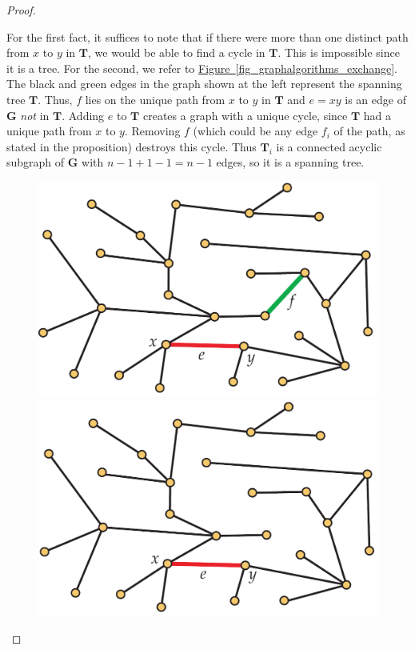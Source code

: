 \documentclass[10pt,]{book}
\theoremstyle{plain}
\theoremstyle{definition}
\theoremstyle{definition}
\theoremstyle{definition}
\theoremstyle{definition}
\numberwithin{equation}{section}
\newlength{\panelmax}
\newcommand{\bfG}{\mathbf{G}}
\newcommand{\bfT}{\mathbf{T}}
\begin{document}
\begin{proof}\hypertarget{proof-6}{}
\hypertarget{p-162}{}%
For the first fact, it suffices to note that if there were more than one distinct path from \(x\) to \(y\) in \(\bfT\), we would be able to find a cycle in \(\bfT\). This is impossible since it is a tree. For the second, we refer to \hyperref[fig_graphalgorithms_exchange]{Figure~\ref{fig_graphalgorithms_exchange}}. The black and green edges in the graph shown at the left represent the spanning tree \(\bfT\). Thus, \(f\) lies on the unique path from \(x\) to \(y\) in \(\bfT\) and \(e=xy\) is an edge of \(\bfG\) \emph{not} in \(\bfT\). Adding \(e\) to \(\bfT\) creates a graph with a unique cycle, since \(\bfT\) had a unique path from \(x\) to \(y\). Removing \(f\) (which could be any edge \(f_i\) of the path, as stated in the proposition) destroys this cycle. Thus \(\bfT_i\) is a connected acyclic subgraph of \(\bfG\) with \(n-1+1-1=n-1\) edges, so it is a spanning tree.%
\begin{figure}
\centering
{%
\setlength{\panelmax}{0pt}
\ifdefined\panelboxAimage\else\newsavebox{\panelboxAimage}\fi%
\begin{lrbox}{\panelboxAimage}
\includegraphics[width=0.48\linewidth]{images/exchange1}
\end{lrbox}
\ifdefined\phAimage\else\newlength{\phAimage}\fi%
\setlength{\phAimage}{\ht\panelboxAimage+\dp\panelboxAimage}
\settototalheight{\phAimage}{\usebox{\panelboxAimage}}
\setlength{\panelmax}{\maxof{\panelmax}{\phAimage}}
\ifdefined\panelboxBimage\else\newsavebox{\panelboxBimage}\fi%
\begin{lrbox}{\panelboxBimage}
\includegraphics[width=0.48\linewidth]{images/exchange2}

\end{lrbox}}
\end{figure}
\end{proof}
\end{document}
